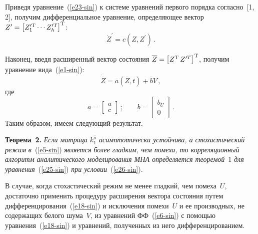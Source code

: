 \begin{multicols}{2}
  Приведя уравнение~(\ref{e23-sin}) к сис\-те\-ме урав\-не\-ний первого порядка 
согласно~[1, 2], получим дифференциальное урав\-не\-ние, определяющее век\-тор 
$Z^\prime\hm= \left[ Z_1^{\prime \mathrm{T}}\cdots Z_h^{\prime \mathrm{T}}\right]^{\mathrm{T}}$:
  \begin{equation*}
  \dot{Z}^\prime = c(Z,Z^\prime)\,.
  \end{equation*}
  
  Наконец, введя расширенный век\-тор со\-сто\-яния $\overline{Z}\hm= \left[ Z^{\mathrm{T}}\, 
Z^{\prime T}\right]^{\mathrm{T}}$, получим урав\-не\-ние вида~(\ref{e1-sin}):
  \begin{equation}
  \dot{\overline{Z}}=\overline{a}\left(\overline{Z},t\right) +\overline{b}V\,,
  \label{e25-sin}
  \end{equation}
где
\begin{equation}
\overline{a}=\begin{bmatrix} a\\ c\end{bmatrix}\,;\qquad
\overline{b}= \begin{bmatrix} b_U\\ 0\end{bmatrix}\,.
\label{e26-sin}
\end{equation}
Таким образом, имеем следующий результат.
  
  \medskip
  
  \noindent
  \textbf{Теорема~2.} \textit{Если мат\-ри\-ца $k_1^{\overline{a}}$ 
асимптотически устойчива, а стохастический режим в}~(\ref{e5-sin}) 
\textit{является более гладким, чем помеха, то корреляционный алгоритм 
аналитического моделирования МНА определяется теоремой}~1 \textit{для 
уравнения}~(\ref{e25-sin}) \textit{при условии}~(\ref{e26-sin}).
  
  \smallskip
  
  В случае, когда стохастический режим не менее гладкий, чем помеха~$U$, 
достаточно применить процедуру расширения вектора со\-сто\-яния путем 
дифференцирования~(\ref{e18-sin}) и исключения помехи~$U$ и ее 
производных, не содержащих белого шума~$V$, из урав\-не\-ний 
  ФФ~(\ref{e6-sin}) с по\-мощью урав\-не\-ния~(\ref{e18-sin}) и урав\-не\-ний, 
полученных из него дифференцированием.
  

\end{multicols}
